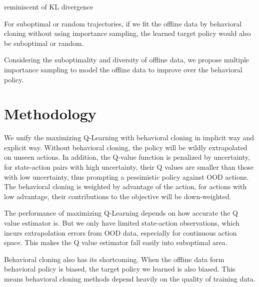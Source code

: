 \documentclass[nohyperref]{article}
\theoremstyle{plain}
\theoremstyle{definition}
\theoremstyle{remark}
\begin{document}
reminiscent of KL divergence 

For suboptimal or random trajectories, if we fit the offline data by behavioral cloning without using importance sampling, the learned target policy would also be suboptimal or random. 

Considering the suboptimality and diversity of offline data, we propose multiple importance sampling to model the offline data to improve over the behavioral policy. 



\section{Methodology}
We unify the maximizing Q-Learning with behavioral cloning in implicit way and explicit way. Without behavioral cloning, the policy will be wildly extrapolated on unseen actions. In addition, the Q-value function is penalized by uncertainty, for state-action pairs with high uncertainty, their Q values are smaller than those with low uncertainty, thus prompting a pessimistic policy against OOD actions. The behavioral cloning is weighted by advantage of the action, for actions with low advantage, their contributions to the objective will be down-weighted. 

The performance of maximizing Q-Learning depends on how accurate the Q value estimator is. But we only have limited state-action observations, which incurs extrapolation errors from OOD data, especially for continuous action space. This makes the Q value estimator fall easily into suboptimal area.

Behavioral cloning also has its shortcoming. When the offline data form behavioral policy is biased, the target policy we learned is also biased. This means behavioral cloning methods depend heavily on the quality of training data.
\end{document}
